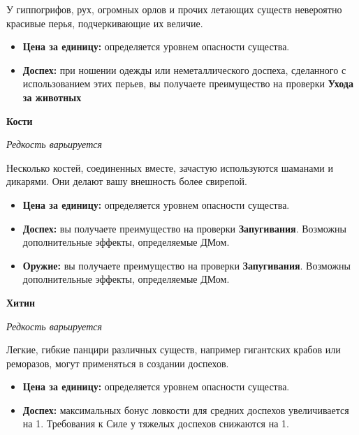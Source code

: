 \documentclass[a4paper, 9pt, twocolumn]{book}
\begin{document}
	\noindent У гиппогрифов, рух, огромных орлов и прочих летающих существ невероятно красивые перья, подчеркивающие их величие.
	
	\begin{itemize}
		\item \textbf{Цена за единицу:} определяется уровнем опасности существа.
		
		\item \textbf{Доспех:} при ношении одежды или неметаллического доспеха, сделанного с использованием этих перьев, вы получаете преимущество на проверки \textbf{Ухода за  животных}
	\end{itemize}

	\noindent \textbf{Кости}
	
	\noindent \textit{Редкость варьируется}
	
	\smallskip
	
	\noindent Несколько костей, соединенных вместе, зачастую используются шаманами и дикарями. Они делают вашу внешность более свирепой.
	
	\begin{itemize}
		\item \textbf{Цена за единицу:} определяется уровнем опасности существа.
		
		\item \textbf{Доспех:} вы получаете преимущество на проверки \textbf{Запугивания}. Возможны дополнительные эффекты, определяемые ДМом.
		
		\item \textbf{Оружие:} вы получаете преимущество на проверки \textbf{Запугивания}. Возможны дополнительные эффекты, определяемые ДМом.
	\end{itemize}
	
	\noindent \textbf{Хитин}
	
	\noindent \textit{Редкость варьируется}
	
	\smallskip
	
	\noindent Легкие, гибкие панцири различных существ, например гигантских крабов или реморазов, могут применяться в создании доспехов.
	
	\begin{itemize}
		\item \textbf{Цена за единицу:} определяется уровнем опасности существа.
		
		\item \textbf{Доспех:} максимальных бонус ловкости для средних доспехов увеличивается на 1. Требования к Силе у тяжелых доспехов снижаются на 1.
	\end{itemize}
\end{document}
